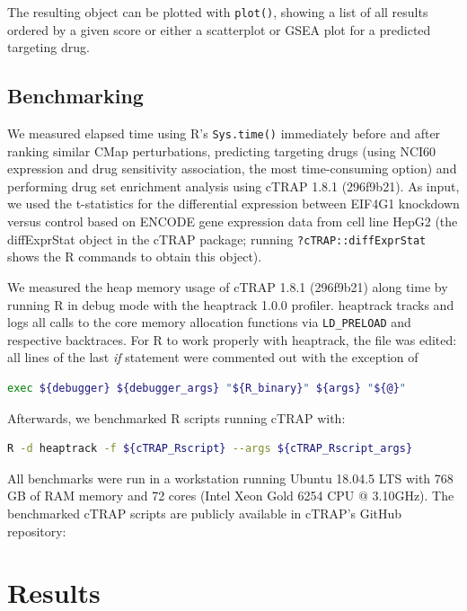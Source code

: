 The resulting object can be plotted with \texttt{plot()}, showing a list of all results ordered by a given score or either a scatterplot or GSEA plot for a predicted targeting drug.


\subsection{Benchmarking}

We measured elapsed time using R’s \texttt{Sys.time()} immediately before and after ranking similar CMap perturbations, predicting targeting drugs (using NCI60 expression and drug sensitivity association, the most time-consuming option) and performing drug set enrichment analysis using cTRAP 1.8.1 (296f9b21). As input, we used the t-statistics for the differential expression between EIF4G1 knockdown versus control based on ENCODE gene expression data from cell line HepG2 (the diffExprStat object in the cTRAP package; running \verb|?cTRAP::diffExprStat| shows the R commands to obtain this object).

We measured the heap memory usage of cTRAP 1.8.1 (296f9b21) along time by running R in debug mode with the heaptrack 1.0.0 profiler. heaptrack tracks and logs all calls to the core memory allocation functions via \verb|LD_PRELOAD| and respective backtraces. For R to work properly with heaptrack, the file  was edited: all lines of the last \emph{if} statement were commented out with the exception of

\begin{lstlisting}[language=bash,numbers=none]
exec ${debugger} ${debugger_args} "${R_binary}" ${args} "${@}"
\end{lstlisting}

Afterwards, we benchmarked R scripts running cTRAP with:

\begin{lstlisting}[language=bash,numbers=none]
R -d heaptrack -f ${cTRAP_Rscript} --args ${cTRAP_Rscript_args}
\end{lstlisting}

All benchmarks were run in a workstation running Ubuntu 18.04.5 LTS with 768 GB of RAM memory and 72 cores (Intel Xeon Gold 6254 CPU @ 3.10GHz). The benchmarked cTRAP scripts are publicly available in cTRAP's GitHub repository: 

\section{Results}

